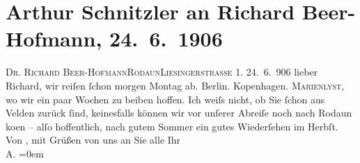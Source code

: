 

         
         \renewcommand{\erwaehntePersonen}{Personen: Richard Beer-Hofmann}
         \renewcommand{\erwaehnteOrte}{Orte: Berlin, IX., Alsergrund, Kopenhagen, Liesingerstraße, Marienlyst, Rodaun, Velden am Wörthersee, Wien}
         \renewcommand{\erwaehnteWerke}{}
               \section[Arthur Schnitzler an Richard Beer-Hofmann, 24. 6. 1906]{ Arthur Schnitzler an Richard Beer-Hofmann, 24. 6. 1906}\nopagebreak{}\rehead{ }\begin{ledgroupsized}[t]{13cm}\normalsize\beginnumbering{} \toendnotes[C]{\smallbreak\pagebreak[2]} 
\pstart{}{\pb}\textsc{Dr. Richard Beer-Hofmann}\pend{}\pstart{}\textsc{Rodaun}\pend{}\pstart{}\textsc{Liesingerstraße} 1.\pend{}{\bigskip}\pstart
           \raggedleft{}{\pb}24. 6. 906\pend
           \pstart{}lieber Richard, \pend\pstart
           wir reiſen ſchon morgen Montag ab. Berlin. Kopenhagen. \textsc{Marienlyst}, wo wir ein paar Wochen zu beiben hoffen. Ich weiſs nicht, ob Sie ſchon aus Velden zurück ſind, keinesfalls können wir vor
               unſerer Abreiſe noch nach Rodaun ko{\geminationm}en – alſo hoffentlich, nach gutem Sommer ein gutes
               Wiederſehen im Herbſt. \pend
           \pstart
           Von \damage{\textcolor{gray}{Herzen}}, mit Grüßen von uns an Sie alle\pend
           \pstart
           Ihr{\\[\baselineskip]}\spacefill\mbox{A.}\pend
           \leftskip=0em{}
         
         \endnumbering{}\end{ledgroupsized}  \newcommand{\dateiname}{L01603}\newcommand{\titel}{Arthur Schnitzler an Richard Beer-Hofmann, 24. 6. 1906}\newcommand{\editorInnen}{Martin Anton Müller und Gerd-Hermann Susen}
      